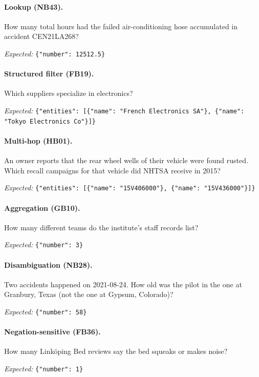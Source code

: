 \paragraph{Lookup (NB43).} How many total hours had the failed air-conditioning hose accumulated in accident CEN21LA268?

{\raggedright\noindent\emph{Expected:} \texttt{\{"number": 12512.5\}}\par}

\paragraph{Structured filter (FB19).} Which suppliers specialize in electronics?

{\raggedright\noindent\emph{Expected:} \texttt{\{"entities": [\{"name": "French Electronics SA"\},\allowbreak{} \{"name": "Tokyo Electronics Co"\}]\}}\par}

\paragraph{Multi-hop (HB01).} An owner reports that the rear wheel wells of their vehicle were found rusted. Which recall campaigns for that vehicle did NHTSA receive in 2015?

{\raggedright\noindent\emph{Expected:} \texttt{\{"entities": [\{"name": "15V406000"\},\allowbreak{} \{"name": "15V436000"\}]\}}\par}

\paragraph{Aggregation (GB10).} How many different teams do the institute's staff records list?

{\raggedright\noindent\emph{Expected:} \texttt{\{"number": 3\}}\par}

\paragraph{Disambiguation (NB28).} Two accidents happened on 2021-08-24. How old was the pilot in the one at Granbury, Texas (not the one at Gypsum, Colorado)?

{\raggedright\noindent\emph{Expected:} \texttt{\{"number": 58\}}\par}

\paragraph{Negation-sensitive (FB36).} How many Linköping Bed reviews say the bed squeaks or makes noise?

{\raggedright\noindent\emph{Expected:} \texttt{\{"number": 1\}}\par}
